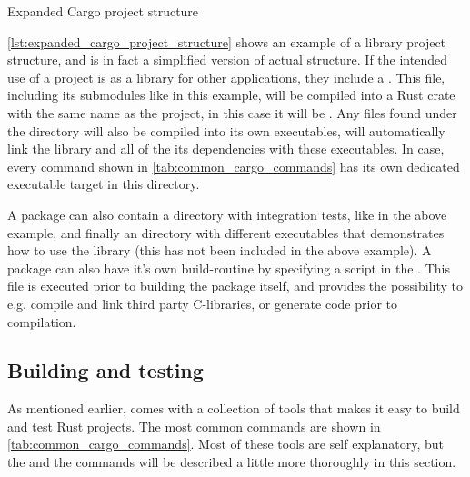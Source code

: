 \begin{listing}
\caption{Expanded Cargo project structure}
\label{lst:expanded_cargo_project_structure}
\end{listing}

\autoref{lst:expanded_cargo_project_structure} shows an example of a library project structure, and is in fact a simplified version of \cargos actual structure.
If the intended use of a project is as a library for other applications, they include a .
This file, including its submodules like  in this example, will be compiled into a Rust crate with the same name as the project, in this case it will be .
Any files found under the  directory will also be compiled into its own executables, \cargo will automatically link the library and all of the its dependencies with these executables.
In \cargos case, every command shown in \autoref{tab:common_cargo_commands} has its own dedicated executable target in this directory.

A package can also contain a  directory with integration tests, like in the above example, and finally an  directory with different executables that demonstrates how to use the library (this has not been included in the above example).
A package can also have it's own build-routine by specifying a  script in the .
This file is executed prior to building the package itself, and provides the possibility to e.g. compile and link third party C-libraries, or generate code prior to compilation.

\subsection{Building and testing}

As mentioned earlier, \cargo comes with a collection of tools that makes it easy to build and test Rust projects.
The most common commands are shown in \autoref{tab:common_cargo_commands}.
Most of these tools are self explanatory, but the  and the  commands will be described a little more thoroughly in this section.

